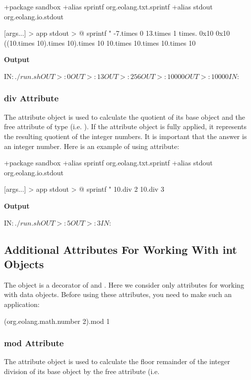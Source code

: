 \documentclass[12pt]{book}
\begin{document}
{\begin{ffcode}
+package sandbox
+alias sprintf org.eolang.txt.sprintf
+alias stdout org.eolang.io.stdout

[args...] > app
  stdout > @
    sprintf
      "%
      -7.times 0
      13.times 1
      times.
        0x10
        0x10
      ((10.times 10).times 10).times 10
      10.times 10.times 10.times 10

\end{ffcode}
\textbf{Output}
\begin{ffcode}

IN$: ./run.sh
OUT>: 0
OUT>: 13
OUT>: 256
OUT>: 10000
OUT>: 10000
IN$:
\end{ffcode}

\subsubsection{div Attribute}
The  attribute object is used to calculate the quotient of its base  object and the free attribute  of type  (i.e. ).
If the  attribute object is fully applied, it represents the resulting quotient of the integer numbers. It is important that the answer is an integer number. Here is an example of using  attribute:

\begin{ffcode}
+package sandbox
+alias sprintf org.eolang.txt.sprintf
+alias stdout org.eolang.io.stdout

[args...] > app
  stdout > @
    sprintf
      "%
      10.div 2
      10.div 3
\end{ffcode}
\textbf{Output}
\begin{ffcode}
IN$: ./run.sh
OUT>: 5
OUT>: 3
IN$:
\end{ffcode}

\subsection{Additional Attributes For Working With int Objects}
The object  is a decorator of  and . Here we consider only attributes for working with  data objects. Before using these attributes, you need to make such an application:
\begin{ffcode}
(org.eolang.math.number 2).mod 1
\end{ffcode}

\subsubsection{mod Attribute}
The  attribute object is used to calculate the floor remainder of the integer division of its base  object by the  free attribute (i.e. \ff{$ %
If the \ff{mod} attribute object is fully applied, it represents the resulting floor modulus (remainder).
The modulus for \ff{x = 0} is undefined. The resulting floor modulus has the same sign as the divisor \ff{x}.
The relationship between the \ff{mod} and \ff{div} operations is as follows:
\ff{(x / y) * y + x %

}}}
\end{document}
